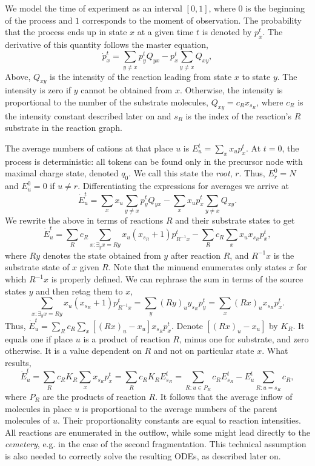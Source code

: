 \documentclass{llncs}
\begin{document}
We model the time of experiment as an interval $[0,1]$, where $0$ is the beginning of the process and $1$ corresponds to the moment of observation. The probability that the process ends up in state $x$ at a given time $t$ is denoted by $p_x^t$. The derivative of this quantity follows the master equation,
        $$\dot{p}_x^t = \sum_{y\not=x} p_y^t Q_{yx} - p_x^t \sum_{y\not=x} Q_{xy},$$
Above, $Q_{xy}$ is the intensity of the reaction leading from state $x$ to state $y$. The intensity is zero if $y$ cannot be obtained from $x$. Otherwise, the intensity is proportional to the number of the substrate molecules, $Q_{xy}=c_R x_{s_R}$,  where $c_R$ is the intensity constant described later on and $s_R$ is the index of the reaction's $R$ substrate in the reaction graph.

The average numbers of cations at that place $u$ is $E_u^t= \sum_x x_up_x^t$.
At $t=0$, the process is deterministic: all tokens can be found only in the precursor node with maximal charge state, denoted $q_0$.  We call this state the \textit{root}, $r$.
Thus, $E_r^0=N$ and $E_u^0=0$ if $u \not= r$. Differentiating the expressions for averages we arrive at
        $$\dot E_u^t=\sum_x x_u \sum_{y\not=x} p_y^t Q_{yx} -\sum_x x_u p_x^t \sum_{y\not=x} Q_{xy}.$$
We rewrite the above in terms of reactions $R$ and their substrate states to get
        $$\dot E_u^t = \sum_R c_R \sum_{x: \exists_y x=Ry}  x_u (x_{s_R}+1) p_{R^{-1}x}^t- \sum_R c_R \sum_{x} x_u x_{s_R} p_x^t,$$
where $Ry$ denotes the state obtained from $y$ after reaction $R$,
and $R^{-1}x$ is the substrate state of $x$ given $R$.
Note that the minuend enumerates only states $x$ for which $R^{-1}x$ is properly defined.
We can rephrase the sum in terms of the source states $y$ and then retag them to $x$,
        $$\sum_{x:\exists_y x=Ry} x_u (x_{s_R}+1) p_{R^{-1}x}^t = \sum_{y}  (Ry)_u y_{s_R} p_y^t = \sum_x (Rx)_u x_{s_R} p_x^t.$$
Thus, $\dot E_u^t = \sum_R c_R \sum_x   \left[(Rx)_u-x_u \right] x_{s_R} p_x^t$. Denote $\left[(Rx)_u-x_u\right]$ by $K_R$. It equals one if place $u$ is a product of reaction $R$, minus one for substrate, and zero otherwise.
It is a value dependent on $R$ and not on particular state $x$.
What results,
        $$\dot E_u^t = \sum_R c_R K_R \sum_x x_{s_R} p_x^t = \sum_R c_R K_R E_{s_R}^t = \sum_{R:u\in P_R} c_R E_{s_R}^t - E_u^t \sum_{R: u=s_R}c_R,$$
where $P_R$ are the products of reaction $R$.
It follows that the average inflow of molecules in place $u$ is proportional to the average numbers of the parent molecules of $u$.
Their proportionality constants are equal to reaction intensities.
All reactions are enumerated in the outflow, while some might lead directly to the \textit{cemetery}, e.g. in the case of the second fragmentation. This technical assumption is also needed to correctly solve the resulting ODEs, as described later on.
\end{document}
